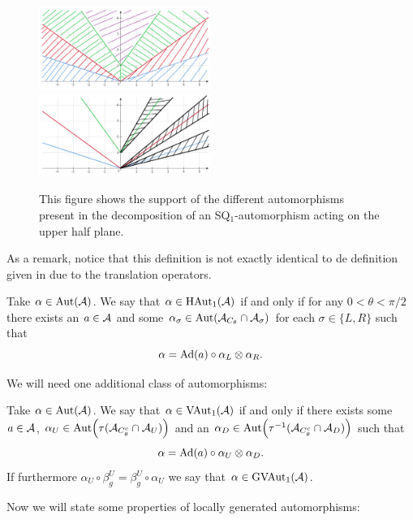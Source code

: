 \documentclass[12pt,a4paper,twoside]{article}
\numberwithin{equation}{section}
\begin{document}
\begin{figure}
	\includegraphics[width=0.5\textwidth]{Figures/AlphaFirstDecomposition.png}
	\includegraphics[width=0.5\textwidth]{Figures/AlphaSecondDecomposition.png}
	\caption{This figure shows the support of the different automorphisms present in the decomposition of an SQ$_1$-automorphism acting on the upper half plane.}
	\label{fig:SetupSQAut}
\end{figure}
As a remark, notice that this definition is not exactly identical to de definition given in \cite{ogata2021h3gmathbb} due to the translation operators.
\begin{definition}
	Take $\alpha\in\Aut{\AA}$. We say that $\alpha\in\textrm{HAut}_1(\AA)$ if and only if for any $0<\theta<\pi/2$ there exists an $a\in\AA$ and some $\alpha_\sigma\in\Aut{\AA_{C_\theta}\cap\AA_\sigma}$ for each $\sigma\in\{L,R\}$ such that
	\begin{equation}
		\alpha=\Ad{a}\circ\alpha_L\otimes\alpha_R.
	\end{equation}
\end{definition}
We will need one additional class of automorphisms:
\begin{definition}
	Take $\alpha\in\Aut{\AA}$. We say that $\alpha\in\textrm{VAut}_1(\AA)$ if and only if there exists some $a\in\AA$, $\alpha_U\in\Aut{\tau(\AA_{C_\theta^c}\cap\AA_{U})}$ and an $\alpha_D\in\Aut{\tau^{-1}(\AA_{C_\theta^c}\cap\AA_{D})}$ such that
	\begin{equation}
		\alpha=\Ad{a}\circ\alpha_U\otimes\alpha_D.
	\end{equation}
	If furthermore $\alpha_U\circ\beta_g^U=\beta_g^U\circ\alpha_U$ we say that $\alpha\in\textrm{GVAut}_1(\AA)$.
\end{definition}
Now we will state some properties of locally generated automorphisms:
\end{document}
